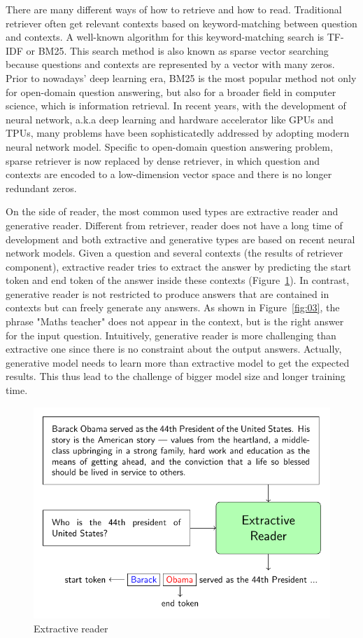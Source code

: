 \documentclass[3p, sort&compress, 12pt]{elsarticle}
\begin{document}
\par There are many different ways of how to retrieve and how to read. Traditional retriever often get relevant contexts based on keyword-matching between question and contexts. A well-known algorithm for this keyword-matching search is TF-IDF or BM25. This search method is also known as sparse vector searching because questions and contexts are represented by a vector with many zeros. Prior to nowadays' deep learning era, BM25 is the most popular method not only for open-domain question answering, but also for a broader field in computer science, which is information retrieval. In recent years, with the development of neural network, a.k.a deep learning and hardware accelerator like GPUs and TPUs, many problems have been sophisticatedly addressed by adopting modern neural network model. Specific to open-domain question answering problem, sparse retriever is now replaced by dense retriever, in which question and contexts are encoded to a low-dimension vector space and there is no longer redundant zeros.
\par On the side of reader, the most common used types are extractive reader and generative reader. Different from retriever, reader does not have a long time of development and both extractive and generative types are based on recent neural network models. Given a question and several contexts (the results of retriever component), extractive reader tries to extract the answer by predicting the start token and end token of the answer inside these contexts (Figure~\ref{fig:02}). In contrast, generative reader is not restricted to produce answers that are contained in contexts but can freely generate any answers. As shown in Figure~\ref{fig:03}, the phrase "Maths teacher" does not appear in the context, but is the right answer for the input question. Intuitively, generative reader is more challenging than extractive one since there is no constraint about the output answers. Actually, generative model needs to learn more than extractive model to get the expected results. This thus lead to the challenge of bigger model size and longer training time. 
\begin{figure}[!htbp]
	\centering
	\includegraphics[scale=1.0]{images/PDF/extractive_reader/extractive_reader.pdf}
	\caption{Extractive reader}
	\label{fig:02}
\end{figure}
\end{document}
